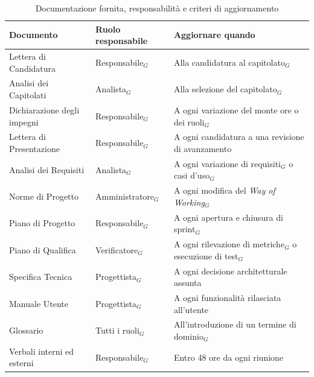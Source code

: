 \documentclass[a4paper, 10pt]{article}
\renewcommand{\arraystretch}{1.2}
\begin{document}
\begin{table}[H]
    \centering
    \renewcommand{\arraystretch}{1.3}
    \begin{tabularx}{\textwidth}{|L|l|L|}
        \hline
        \textbf{Documento} & \textbf{Ruolo responsabile} & \textbf{Aggiornare quando} \\
        \hline
        Lettera di Candidatura & Responsabile$_G$ & Alla candidatura al capitolato$_G$ \\ \hline
        Analisi dei Capitolati & Analista$_G$ & Alla selezione del capitolato$_G$ \\ \hline
        Dichiarazione degli impegni & Responsabile$_G$ & A ogni variazione del monte ore o dei ruoli$_G$ \\ \hline
        Lettera di Presentazione & Responsabile$_G$ & A ogni candidatura a una revisione di avanzamento \\ \hline
        Analisi dei Requisiti & Analista$_G$ & A ogni variazione di requisiti$_G$ o casi d'uso$_G$ \\ \hline
        Norme di Progetto & Amministratore$_G$ & A ogni modifica del \textit{Way of Working$_G$} \\ \hline
        Piano di Progetto & Responsabile$_G$ & A ogni apertura e chiusura di sprint$_G$ \\ \hline
        Piano di Qualifica & Verificatore$_G$ & A ogni rilevazione di metriche$_G$ o esecuzione di test$_G$ \\ \hline
        Specifica Tecnica & Progettista$_G$ & A ogni decisione architetturale assunta \\ \hline
        Manuale Utente & Progettista$_G$ & A ogni funzionalità rilasciata all'utente \\ \hline
        Glossario & Tutti i ruoli$_G$ & All'introduzione di un termine di dominio$_G$ \\ \hline
        Verbali interni ed esterni & Responsabile$_G$ & Entro 48 ore da ogni riunione \\ \hline
    \end{tabularx}
    \caption{Documentazione fornita, responsabilità e criteri di aggiornamento}
\end{table}
\end{document}
